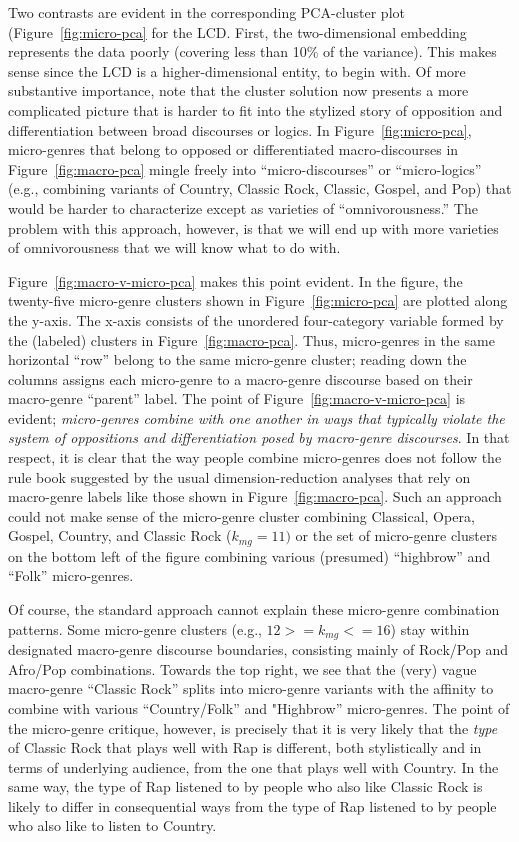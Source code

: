 \documentclass[a4paper,12pt]{extarticle}
\begin{document}
 Two contrasts are evident in the corresponding PCA-cluster plot (Figure~\ref{fig:micro-pca} for the LCD. First, the two-dimensional embedding represents the data poorly (covering less than 10\% of the variance). This makes sense since the LCD is a higher-dimensional entity, to begin with. Of more substantive importance, note that the cluster solution now presents a more complicated picture that is harder to fit into the stylized story of opposition and differentiation between broad discourses or logics. In Figure~\ref{fig:micro-pca}, micro-genres that belong to opposed or differentiated macro-discourses in Figure~\ref{fig:macro-pca} mingle freely into ``micro-discourses'' or ``micro-logics'' (e.g., combining variants of Country, Classic Rock, Classic, Gospel, and Pop) that would be harder to characterize except as varieties of ``omnivorousness.'' The problem with this approach, however, is that we will end up with more varieties of omnivorousness that we will know what to do with. 

 Figure~\ref{fig:macro-v-micro-pca} makes this point evident. In the figure, the twenty-five micro-genre clusters shown in Figure~\ref{fig:micro-pca} are plotted along the y-axis. The x-axis consists of the unordered four-category variable formed by the (labeled) clusters in Figure~\ref{fig:macro-pca}. Thus, micro-genres in the same horizontal ``row'' belong to the same micro-genre cluster; reading down the columns assigns each micro-genre to a macro-genre discourse based on their macro-genre ``parent'' label. The point of Figure~\ref{fig:macro-v-micro-pca} is evident; {\em micro-genres combine with one another in ways that typically violate the system of oppositions and differentiation posed by macro-genre discourses}. In that respect, it is clear that the way people combine micro-genres does not follow the rule book suggested by the usual dimension-reduction analyses that rely on macro-genre labels like those shown in Figure~\ref{fig:macro-pca}. Such an approach could not make sense of the micro-genre cluster combining Classical, Opera, Gospel, Country, and Classic Rock ($k_{mg}=11)$ or the set of micro-genre clusters on the bottom left of the figure combining various (presumed) ``highbrow'' and ``Folk'' micro-genres. 
 
 Of course, the standard approach cannot explain these micro-genre combination patterns. Some micro-genre clusters (e.g., $12 >=k_{mg}<=16$) stay within designated macro-genre discourse boundaries, consisting mainly of Rock/Pop and Afro/Pop combinations. Towards the top right, we see that the (very) vague macro-genre ``Classic Rock'' splits into micro-genre variants with the affinity to combine with various ``Country/Folk'' and "Highbrow'' micro-genres. The point of the micro-genre critique, however, is precisely that it is very likely that the {\em type} of Classic Rock that plays well with Rap is different, both stylistically and in terms of underlying audience, from the one that plays well with Country. In the same way, the type of Rap listened to by people who also like Classic Rock is likely to differ in consequential ways from the type of Rap listened to by people who also like to listen to Country. 
\end{document}
